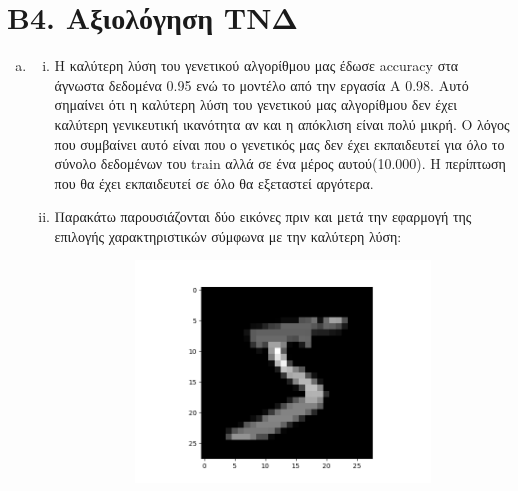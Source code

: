 \documentclass[12pt,a4paper]{article}
\newcommand{\tl}{\textlatin}
\begin{document}
        \section*{Β4. Αξιολόγηση ΤΝΔ}

            \begin{enumerate}[a)]
                \item
                    \begin{enumerate}[i.]
                        \item Η καλύτερη λύση του γενετικού αλγορίθμου μας έδωσε
                            \tl{accuracy} στα άγνωστα δεδομένα 0.95 ενώ το
                            μοντέλο από την εργασία Α 0.98. Αυτό σημαίνει ότι η
                            καλύτερη λύση του γενετικού μας αλγορίθμου δεν έχει
                            καλύτερη γενικευτική ικανότητα αν και η απόκλιση
                            είναι πολύ μικρή. Ο λόγος που συμβαίνει αυτό είναι
                            που ο γενετικός μας δεν έχει εκπαιδευτεί για όλο το
                            σύνολο δεδομένων του \tl{train} αλλά σε ένα μέρος
                            αυτού(10.000). Η περίπτωση που θα έχει εκπαιδευτεί
                            σε όλο θα εξεταστεί αργότερα.
                            \\
                        \item Παρακάτω παρουσιάζονται δύο εικόνες πριν και μετά
                            την εφαρμογή της επιλογής χαρακτηριστικών σύμφωνα με
                            την καλύτερη λύση: 
                            \begin{figure}[H]
                                \begin{subfigure}{0.5\textwidth}
                                    \raggedleft
                                    \includegraphics[width=\textwidth]{images/im2.png}

\end{subfigure}
\end{figure}
\end{enumerate}
\end{enumerate}
\end{document}
